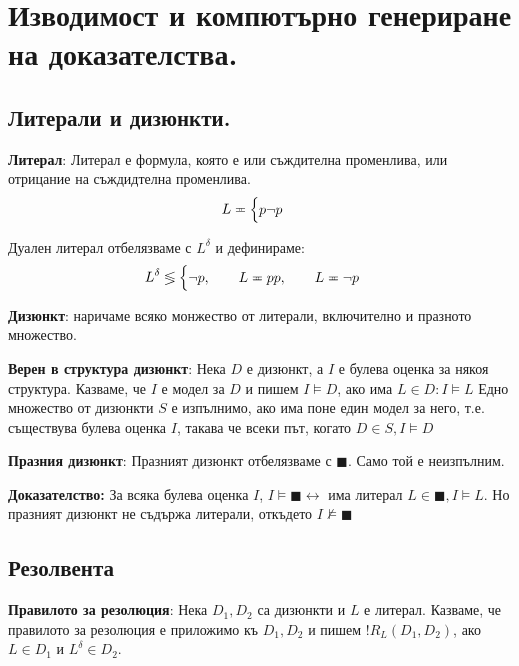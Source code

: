 \documentclass{article}
\renewcommand{\\}{\newline}
\newcommand{\doc}{\textbf{Доказателство: }}
\begin{document}
\section{Изводимост и компютърно генериране на доказателства.}

\subsection{Литерали и дизюнкти.} 

\textbf{Литерал}: Литерал е формула, която е или съждителна променлива, или отрицание на съждидтелна променлива. \[
  L\eqcirc \begin{cases}
    p \\ 
    \lnot p
  \end{cases}
\] 

Дуален литерал отбелязваме с \(L^{\delta}\) и дефинираме: \[
  L^{\delta} \lessgtr \begin{cases}
    \lnot p, \qquad L \eqcirc p\\
    p, \qquad L \eqcirc \lnot p
  \end{cases}
\]  

\textbf{Дизюнкт}: наричаме всяко монжество от литерали, включително и празното множество.

\textbf{Верен в структура дизюнкт}: Нека \(D\) е дизюнкт, а \(I\) е булева оценка за някоя структура. Казваме, че \(I\) е модел за \(D\) и пишем \(I \vDash D\), ако има \(L \in D: I \vDash L\)       
Едно множество от дизюнкти \(S\)   е изпълнимо, ако има поне един модел за него, т.е. съществува булева оценка \(I\), такава че всеки път, когато \(D \in S, I \vDash D\)  

\textbf{Празния дизюнкт}: Празният дизюнкт отбелязваме с \(\blacksquare\). Само той е неизпълним.

\doc За всяка булева оценка \(I\), \(I \vDash \blacksquare \leftrightarrow\) има литерал \(L \in \blacksquare, I \vDash L\). Но празният дизюнкт не съдържа литерали, откъдето \(I \not\vDash \blacksquare\)     

\subsection{Резолвента}

\textbf{Правилото за резолюция}: Нека \(D_1, D_2\) са дизюнкти и \(L\) е литерал. Казваме, че правилото за резолюция е приложимо къ \(D_1, D_2\) и пишем \(!R_{L}(D_1, D_2)\), ако \(L \in D_1\) и \(L^{\delta} \in D_2\).
\end{document}
